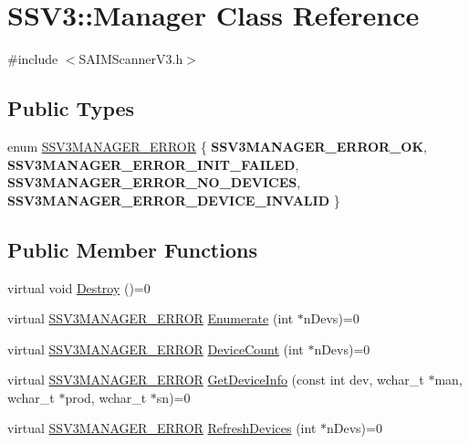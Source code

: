 \hypertarget{classSSV3_1_1Manager}{}\section{S\+S\+V3\+:\+:Manager Class Reference}
\label{classSSV3_1_1Manager}


{\ttfamily \#include $<$S\+A\+I\+M\+Scanner\+V3.\+h$>$}

\subsection*{Public Types}
\begin{DoxyCompactItemize}
\item 
enum \hyperlink{classSSV3_1_1Manager_a29b6ac14b348cc4676523f74f8d0a8e1}{S\+S\+V3\+M\+A\+N\+A\+G\+E\+R\+\_\+\+E\+R\+R\+OR} \{ {\bfseries S\+S\+V3\+M\+A\+N\+A\+G\+E\+R\+\_\+\+E\+R\+R\+O\+R\+\_\+\+OK}, 
{\bfseries S\+S\+V3\+M\+A\+N\+A\+G\+E\+R\+\_\+\+E\+R\+R\+O\+R\+\_\+\+I\+N\+I\+T\+\_\+\+F\+A\+I\+L\+ED}, 
{\bfseries S\+S\+V3\+M\+A\+N\+A\+G\+E\+R\+\_\+\+E\+R\+R\+O\+R\+\_\+\+N\+O\+\_\+\+D\+E\+V\+I\+C\+ES}, 
{\bfseries S\+S\+V3\+M\+A\+N\+A\+G\+E\+R\+\_\+\+E\+R\+R\+O\+R\+\_\+\+D\+E\+V\+I\+C\+E\+\_\+\+I\+N\+V\+A\+L\+ID}
 \}
\end{DoxyCompactItemize}
\subsection*{Public Member Functions}
\begin{DoxyCompactItemize}
\item 
virtual void \hyperlink{classSSV3_1_1Manager_af81c512bd20f24b3759834062f9c1287}{Destroy} ()=0
\item 
virtual \hyperlink{classSSV3_1_1Manager_a29b6ac14b348cc4676523f74f8d0a8e1}{S\+S\+V3\+M\+A\+N\+A\+G\+E\+R\+\_\+\+E\+R\+R\+OR} \hyperlink{classSSV3_1_1Manager_abbcf07ea9aee51a09a6035086da0df6e}{Enumerate} (int $\ast$n\+Devs)=0
\item 
virtual \hyperlink{classSSV3_1_1Manager_a29b6ac14b348cc4676523f74f8d0a8e1}{S\+S\+V3\+M\+A\+N\+A\+G\+E\+R\+\_\+\+E\+R\+R\+OR} \hyperlink{classSSV3_1_1Manager_ab8628bbde656c4fda84685bca801606a}{Device\+Count} (int $\ast$n\+Devs)=0
\item 
virtual \hyperlink{classSSV3_1_1Manager_a29b6ac14b348cc4676523f74f8d0a8e1}{S\+S\+V3\+M\+A\+N\+A\+G\+E\+R\+\_\+\+E\+R\+R\+OR} \hyperlink{classSSV3_1_1Manager_a20142bb2d1df235738ff5e651eea7331}{Get\+Device\+Info} (const int dev, wchar\+\_\+t $\ast$man, wchar\+\_\+t $\ast$prod, wchar\+\_\+t $\ast$sn)=0
\item 
virtual \hyperlink{classSSV3_1_1Manager_a29b6ac14b348cc4676523f74f8d0a8e1}{S\+S\+V3\+M\+A\+N\+A\+G\+E\+R\+\_\+\+E\+R\+R\+OR} \hyperlink{classSSV3_1_1Manager_a1839a87d09246a89b15e3da91c57be6e}{Refresh\+Devices} (int $\ast$n\+Devs)=0
\end{DoxyCompactItemize}


